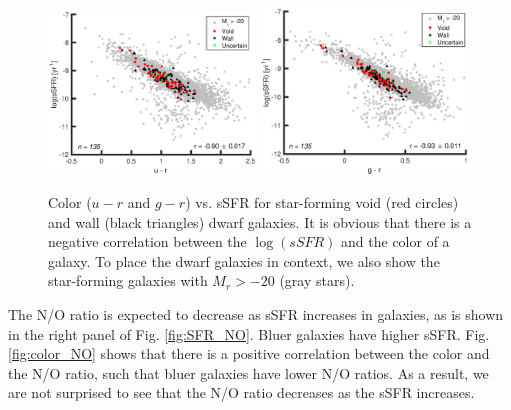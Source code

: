 \begin{figure}
    \includegraphics[width=0.49\textwidth]{Images/Paper2/u-r_sSFR_dwarf_0-20_SF_t3}
    \includegraphics[width=0.49\textwidth]{Images/Paper2/g-r_sSFR_dwarf_0-20_SF_t3}
    \caption[Color versus sSFR for 135 dwarf galaxy sample]{Color ($u-r$ and 
    $g-r$) vs. sSFR for star-forming void (red circles) and wall (black 
    triangles) dwarf galaxies.  It is obvious that there is a negative 
    correlation between the $\log (sSFR)$ and the color of a galaxy.  To place 
    the dwarf galaxies in context, we also show the star-forming galaxies with 
    $M_r > -20$ (gray stars).}
    \label{fig:color_sSFR}
\end{figure}

The N/O ratio is expected to decrease as sSFR increases in galaxies, as is shown 
in the right panel of Fig. \ref{fig:SFR_NO}.  Bluer galaxies have higher sSFR.  
Fig. \ref{fig:color_NO} shows that there is a positive correlation between the 
color and the N/O ratio, such that bluer galaxies have lower N/O ratios.  As a 
result, we are not surprised to see that the N/O ratio decreases as the sSFR 
increases.

